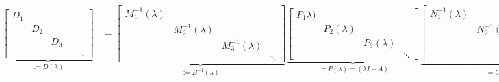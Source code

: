 \documentclass[11pt]{article}
\begin{document}
\footnotesize{
\begin{align}
\underbrace{\begin{bmatrix}
D_1 & & & \\
& D_2 & & \\
& & D_3 & \\
& & & & \ddots
\end{bmatrix} }_{:= D(\lambda)}
&=
\underbrace{\begin{bmatrix}
M_1^{-1}(\lambda) & & &\\
& M_2^{-1}(\lambda) & &\\
& & M_3^{-1}(\lambda) & \\
& & & \ddots
\end{bmatrix}}_{:=B^{-1}(\lambda)}
\underbrace{\begin{bmatrix}
P_1\lambda) & & &\\
& P_2(\lambda) & &\\
& & P_3(\lambda) &\\
& & & \ddots
\end{bmatrix}}_{:= P(\lambda) = (\lambda I - A)}
\underbrace{\begin{bmatrix}
N_1^{-1}(\lambda) & & &\\
& N_2^{-1}(\lambda) & &\\
& & N_3^{-1}(\lambda) & \\
& & & \ddots
\end{bmatrix}}_{:=C^{-1}(\lambda)}
\end{align}\label{a4}}
\normalsize
\end{document}
